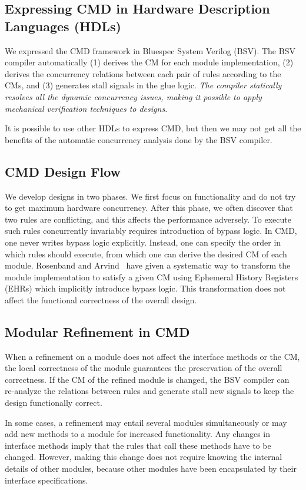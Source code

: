 \documentclass[conference]{IEEEtran}
\begin{document}
\subsection{Expressing CMD in Hardware Description Languages (HDLs)}
We expressed the CMD framework in Bluespec System Verilog (BSV).
The BSV compiler automatically (1) derives the CM for each module implementation, (2) derives the concurrency relations between each pair of rules according to the CMs, and (3) generates stall signals in the glue logic.
\emph{The compiler statically resolves all the dynamic concurrency issues, making it possible to apply mechanical verification  techniques to designs.}

It is possible to use other HDLs to express CMD, but then we may not get all the benefits of the automatic concurrency analysis done by the BSV compiler.

\subsection{CMD Design Flow}
We develop designs in two phases.
We first focus on functionality and do not try to get maximum hardware concurrency.
After this phase, we often discover that two rules are conflicting, and this affects the performance adversely.
To execute such rules concurrently invariably requires introduction of bypass logic.
In CMD, one never writes bypass logic explicitly.
Instead, one can specify the order in which rules should execute, from which one can derive the desired CM of each module.
Rosenband and Arvind~\cite{rosenband2005hardware} have given a systematic way to transform the module implementation to satisfy a given CM using Ephemeral History Registers (EHRs) which implicitly introduce bypass logic.
This transformation does not affect the functional correctness of the overall design.

\subsection{Modular Refinement in CMD}
When a refinement on a module does not affect the interface methods or the CM, the local correctness of the module guarantees the preservation of the overall correctness.
If the CM of the refined module is changed, the BSV compiler can re-analyze the relations between rules and generate stall new signals to keep the design functionally correct.

In some cases, a refinement may entail several modules simultaneously or may add new methods to a module for increased functionality.
Any changes in interface methods imply that the rules that call these methods have to be changed.
However, making this change does not require knowing the internal details of other modules, because other modules have been encapsulated by their interface specifications.
\end{document}
